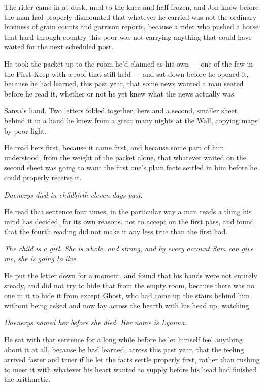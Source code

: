 The rider came in at dusk, mud to the knee and half-frozen, and Jon knew before the man had properly dismounted that whatever he carried was not the ordinary business of grain counts and garrison reports, because a rider who pushed a horse that hard through country this poor was not carrying anything that could have waited for the next scheduled post.

He took the packet up to the room he’d claimed as his own — one of the few in the First Keep with a roof that still held — and sat down before he opened it, because he had learned, this past year, that some news wanted a man seated before he read it, whether or not he yet knew what the news actually was.

Sansa’s hand. Two letters folded together, hers and a second, smaller sheet behind it in a hand he knew from a great many nights at the Wall, copying maps by poor light.

\sceneBreak

He read hers first, because it came first, and because some part of him understood, from the weight of the packet alone, that whatever waited on the second sheet was going to want the first one’s plain facts settled in him before he could properly receive it.

\textit{Daenerys died in childbirth eleven days past.}

He read that sentence four times, in the particular way a man reads a thing his mind has decided, for its own reasons, not to accept on the first pass, and found that the fourth reading did not make it any less true than the first had.

\textit{The child is a girl. She is whole, and strong, and by every account Sam can give me, she is going to live.}

He put the letter down for a moment, and found that his hands were not entirely steady, and did not try to hide that from the empty room, because there was no one in it to hide it from except Ghost, who had come up the stairs behind him without being asked and now lay across the hearth with his head up, watching.

\textit{Daenerys named her before she died. Her name is Lyanna.}

\sceneBreak

He sat with that sentence for a long while before he let himself feel anything about it at all, because he had learned, across this past year, that the feeling arrived faster and truer if he let the facts settle properly first, rather than rushing to meet it with whatever his heart wanted to supply before his head had finished the arithmetic.

